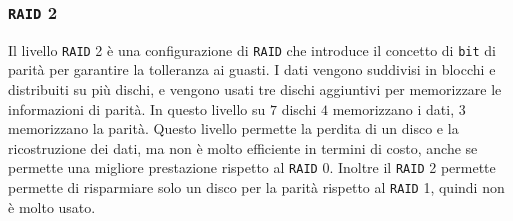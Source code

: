     \subsubsection{\texttt{RAID} 2}
        Il livello \texttt{RAID} 2 è una configurazione di \texttt{RAID} che introduce il concetto di \texttt{bit} di parità per garantire la tolleranza ai guasti. I dati vengono suddivisi in blocchi e distribuiti su più dischi, e vengono usati tre dischi aggiuntivi per memorizzare le informazioni di parità. In questo livello su $7$ dischi $4$ memorizzano i dati, $3$ memorizzano la parità. Questo livello permette la perdita di un disco e la ricostruzione dei dati, ma non è molto efficiente in termini di costo, anche se permette una migliore prestazione rispetto al \texttt{RAID} 0. Inoltre il \texttt{RAID} 2 permette permette di risparmiare solo un disco per la parità rispetto al \texttt{RAID} 1, quindi non è molto usato.
